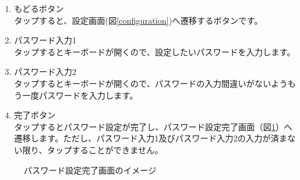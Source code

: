 \documentclass[a4j]{jarticle}
\begin{document}
\begin{enumerate}
  \renewcommand{\labelenumi}{\textcircled{\scriptsize \theenumi}}
\item もどるボタン\\
  タップすると、設定画面(図\ref{configuration})へ遷移するボタンです。
\item パスワード入力1\\
  タップするとキーボードが開くので、設定したいパスワードを入力します。
\item パスワード入力2\\
  タップするとキーボードが開くので、パスワードの入力間違いがないようもう一度パスワードを入力します。
\item 完了ボタン\\
  タップするとパスワード設定が完了し、パスワード設定完了画面（図\ref{passwordchange_check}）へ遷移します。ただし、パスワード入力1及びパスワード入力2の入力が済まない限り、タップすることができません。
\end{enumerate}

\begin{figure}[H]
    \begin{center}
    \caption {パスワード設定完了画面のイメージ}
    \label{passwordchange_check}
    \end{center}
\end{figure}
\end{document}

